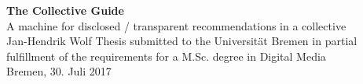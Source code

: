 \documentclass[12pt,numbers=noenddot,parskip,bibliography=totocnumbered,listof=totocnumbered]{scrreprt}
\begin{document}
\begin{titlepage}
\null
\vfill
\Huge\textsf{\textbf{The Collective Guide
\vspace{0.5em}}}\\
\LARGE\textsf{A machine for disclosed / transparent recommendations in a collective}
\vspace{1.5em}\\
\Large\textsf{Jan-Hendrik Wolf}
\vfill
\vfill
\vfill
\small{Thesis submitted to the Universität Bremen in partial fulfillment of the requirements for a M.Sc. degree in Digital Media\\
Bremen, 30. Juli 2017}

\end{titlepage}

\tableofcontents
\thispagestyle{nochapternumber}






\end{document}
